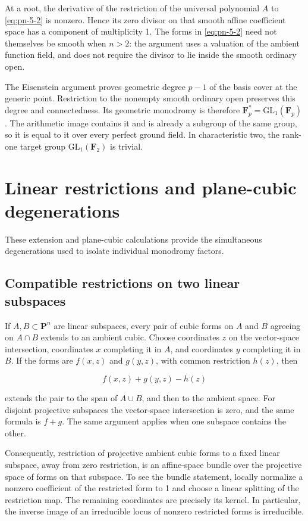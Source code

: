 \documentclass[11pt]{article}
\begin{document}
At a root, the derivative of the restriction of the universal polynomial
\(A\) to \eqref{eq:pn-5-2} is nonzero. Hence its zero divisor on that smooth affine
coefficient space has a component of multiplicity 1. The forms in \eqref{eq:pn-5-2}
need not themselves be smooth when \(n>2\): the argument uses a valuation
of the ambient function field, and does not require the divisor to lie
inside the smooth ordinary open.

The Eisenstein argument proves geometric degree \(p-1\) of the basis
cover at the generic point. Restriction to the nonempty smooth ordinary
open preserves this degree and connectedness. Its geometric monodromy
is therefore \(\mathbf F_p^*=\mathrm{GL}_1(\mathbf F_p)\). The arithmetic
image contains it and is already a subgroup of the same group, so it is
equal to it over every perfect ground field. In characteristic two, the
rank-one target group \(\mathrm{GL}_1(\mathbf F_2)\) is trivial.

\section{Linear restrictions and plane-cubic degenerations}\label{sec:cubic-geometry}
These extension and plane-cubic calculations provide the simultaneous degenerations used to isolate individual monodromy factors.


\subsection{Compatible restrictions on two linear subspaces}\label{sec:cubic-restrictions}

If \(A,B\subset\mathbf P^n\) are linear subspaces, every pair of cubic forms on \(A\) and \(B\) agreeing on \(A\cap B\) extends to an ambient cubic. Choose coordinates \(z\) on the vector-space intersection, coordinates \(x\) completing it in \(A\), and coordinates \(y\) completing it in \(B\). If the forms are \(f(x,z)\) and \(g(y,z)\), with common restriction \(h(z)\), then

\[
f(x,z)+g(y,z)-h(z)
\]

extends the pair to the span of \(A\cup B\), and then to the ambient space. For disjoint projective subspaces the vector-space intersection is zero, and the same formula is \(f+g\). The same argument applies when one subspace contains the other.

Consequently, restriction of projective ambient cubic forms to a fixed linear subspace, away from zero restriction, is an affine-space bundle over the projective space of forms on that subspace. To see the bundle statement, locally normalize a nonzero coefficient of the restricted form to 1 and choose a linear splitting of the restriction map. The remaining coordinates are precisely its kernel. In particular, the inverse image of an irreducible locus of nonzero restricted forms is irreducible.
\end{document}
